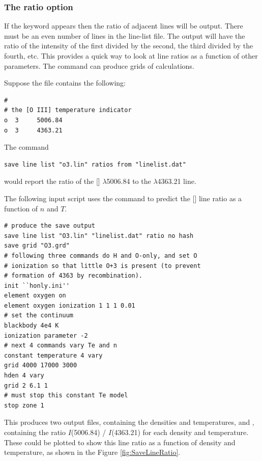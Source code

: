 \subsubsection{The ratio option}
If the keyword  appears then the ratio of adjacent
lines will be output.
There must be an even number of lines in the line-list file.
The output will have the ratio of the intensity of the first divided
by the second, the third divided by the fourth, etc.
This provides a quick way to look at line ratios as a function
of other parameters.
The  command can produce grids of calculations.

Suppose the file  contains the following:
\begin{verbatim}
#
# the [O III] temperature indicator
o  3     5006.84
o  3     4363.21
\end{verbatim}
The command
\begin{verbatim}
save line list "o3.lin" ratios from "linelist.dat"
\end{verbatim}
would report the ratio of the [\oiii] $\lambda$5006.84 to the $\lambda$4363.21 line.

The following input script
uses the  command to predict the [\oiii] line ratio as a function of
$n$ and $T$.
\begin{verbatim}
# produce the save output
save line list "O3.lin" "linelist.dat" ratio no hash
save grid "O3.grd"
# following three commands do H and O-only, and set O
# ionization so that little O+3 is present (to prevent
# formation of 4363 by recombination).
init ``honly.ini''
element oxygen on
element oxygen ionization 1 1 1 0.01
# set the continuum
blackbody 4e4 K
ionization parameter -2
# next 4 commands vary Te and n
constant temperature 4 vary
grid 4000 17000 3000
hden 4 vary
grid 2 6.1 1
# must stop this constant Te model
stop zone 1
\end{verbatim}
This produces two output files, 
containing the densities and temperatures,
and , containing the ratio $I$(5006.84) / $I$(4363.21)
for each density and temperature.
These could be plotted to show this line ratio
as a function of density and temperature,
as shown in the Figure \ref{fig:SaveLineRatio}.

